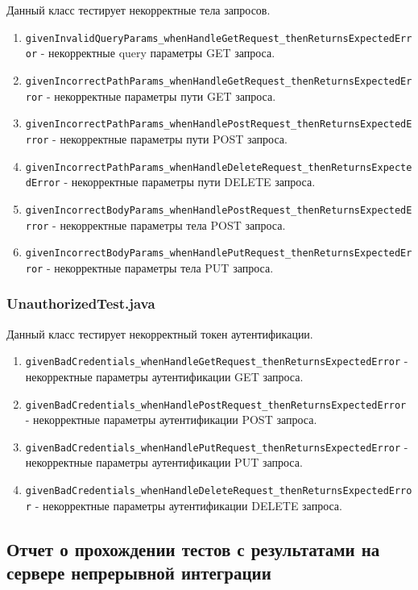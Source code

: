 \documentclass[a4paper, 14pt]{article}
\begin{document}
Данный класс тестирует некорректные тела запросов.

\begin{enumerate}
    \item \texttt{givenInvalidQueryParams\_whenHandleGetRequest\_thenReturnsExpectedError} - некорректные query параметры GET запроса.
    \item \texttt{givenIncorrectPathParams\_whenHandleGetRequest\_thenReturnsExpectedError} - некорректные параметры пути GET запроса.
    \item \texttt{givenIncorrectPathParams\_whenHandlePostRequest\_thenReturnsExpectedError} - некорректные параметры пути POST запроса.
    \item \texttt{givenIncorrectPathParams\_whenHandleDeleteRequest\_thenReturnsExpectedError} - некорректные параметры пути DELETE запроса.
    \item \texttt{givenIncorrectBodyParams\_whenHandlePostRequest\_thenReturnsExpectedError} - некорректные параметры тела POST запроса.
    \item \texttt{givenIncorrectBodyParams\_whenHandlePutRequest\_thenReturnsExpectedError} - некорректные параметры тела PUT запроса.
\end{enumerate}

\subsubsection{UnauthorizedTest.java}

Данный класс тестирует некорректный токен аутентификации.

\begin{enumerate}
    \item \texttt{givenBadCredentials\_whenHandleGetRequest\_thenReturnsExpectedError} - некорректные параметры аутентификации GET запроса.
    \item \texttt{givenBadCredentials\_whenHandlePostRequest\_thenReturnsExpectedError} - некорректные параметры аутентификации POST запроса.
    \item \texttt{givenBadCredentials\_whenHandlePutRequest\_thenReturnsExpectedError} - некорректные параметры аутентификации PUT запроса.
    \item \texttt{givenBadCredentials\_whenHandleDeleteRequest\_thenReturnsExpectedError} - некорректные параметры аутентификации DELETE запроса.
\end{enumerate}

\subsection{Отчет о прохождении тестов с результатами на сервере непрерывной интеграции}
\end{document}
